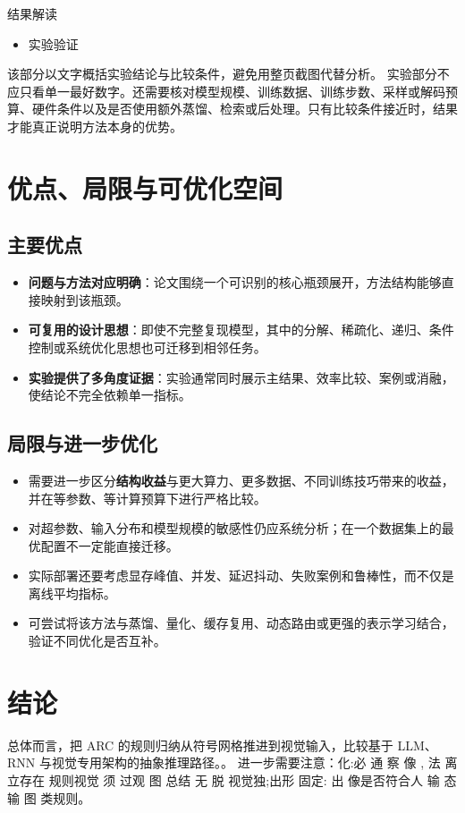 \documentclass[UTF8,11pt,a4paper]{ctexart}
\newcommand{\term}[1]{\textbf{\textcolor{mainblue}{#1}}}
\begin{document}
\begin{notebox}{结果解读}
\begin{itemize}
\item 实验验证
\end{itemize}
\end{notebox}

该部分以文字概括实验结论与比较条件，避免用整页截图代替分析。
实验部分不应只看单一最好数字。还需要核对模型规模、训练数据、训练步数、采样或解码预算、硬件条件以及是否使用额外蒸馏、检索或后处理。只有比较条件接近时，结果才能真正说明方法本身的优势。

\section{优点、局限与可优化空间}
\subsection{主要优点}
\begin{itemize}
\item \term{问题与方法对应明确}：论文围绕一个可识别的核心瓶颈展开，方法结构能够直接映射到该瓶颈。
\item \term{可复用的设计思想}：即使不完整复现模型，其中的分解、稀疏化、递归、条件控制或系统优化思想也可迁移到相邻任务。
\item \term{实验提供了多角度证据}：实验通常同时展示主结果、效率比较、案例或消融，使结论不完全依赖单一指标。
\end{itemize}

\subsection{局限与进一步优化}
\begin{itemize}
\item 需要进一步区分\term{结构收益}与更大算力、更多数据、不同训练技巧带来的收益，并在等参数、等计算预算下进行严格比较。
\item 对超参数、输入分布和模型规模的敏感性仍应系统分析；在一个数据集上的最优配置不一定能直接迁移。
\item 实际部署还要考虑显存峰值、并发、延迟抖动、失败案例和鲁棒性，而不仅是离线平均指标。
\item 可尝试将该方法与蒸馏、量化、缓存复用、动态路由或更强的表示学习结合，验证不同优化是否互补。
\end{itemize}

\section{结论}
总体而言，把 ARC 的规则归纳从符号网格推进到视觉输入，比较基于 LLM、RNN 与视觉专用架构的抽象推理路径。。 进一步需要注意：化:必 通 察 像 , 法 离 立存在 规则视觉 须 过观 图 总结 无 脱 视觉独;出形 固定: 出 像是否符合人 输 态 输 图 类规则。
\end{document}
